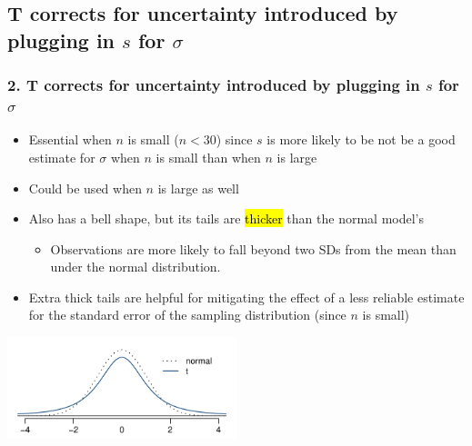 \documentclass[slidestop,compress,mathserif,12pt,t,professionalfonts,xcolor=table]{beamer}
\begin{document}

\subsection{T corrects for uncertainty introduced by plugging in $s$ for $\sigma$}
\label{mi2}


\begin{frame}
\frametitle{2. T corrects for uncertainty introduced by plugging in $s$ for $\sigma$}

\begin{itemize}

\item Essential when $n$ is small ($n < 30$) since $s$ is more likely to be not be a good estimate for $\sigma$ when $n$ is small than when $n$ is large

\pause

\item Could be used when $n$ is large as well

\pause

\item Also has a bell shape, but its tails are \hl{thicker} than the normal model's
\begin{itemize}
\item Observations are more likely to fall beyond two SDs from the mean than under the normal distribution.
\end{itemize}

\pause

\item Extra thick tails are helpful for mitigating the effect of a less reliable estimate for the standard error of the sampling distribution (since $n$ is small)

\end{itemize}

\begin{center}
\includegraphics[width=0.5\textwidth]{figures/tDistCompareToNormalDist/tDistCompareToNormalDist}
\end{center}


\end{frame}
\end{document}
